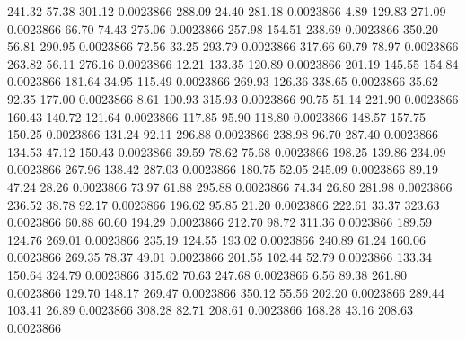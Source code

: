     241.32     57.38    301.12  0.0023866
    288.09     24.40    281.18  0.0023866
      4.89    129.83    271.09  0.0023866
     66.70     74.43    275.06  0.0023866
    257.98    154.51    238.69  0.0023866
    350.20     56.81    290.95  0.0023866
     72.56     33.25    293.79  0.0023866
    317.66     60.79     78.97  0.0023866
    263.82     56.11    276.16  0.0023866
     12.21    133.35    120.89  0.0023866
    201.19    145.55    154.84  0.0023866
    181.64     34.95    115.49  0.0023866
    269.93    126.36    338.65  0.0023866
     35.62     92.35    177.00  0.0023866
      8.61    100.93    315.93  0.0023866
     90.75     51.14    221.90  0.0023866
    160.43    140.72    121.64  0.0023866
    117.85     95.90    118.80  0.0023866
    148.57    157.75    150.25  0.0023866
    131.24     92.11    296.88  0.0023866
    238.98     96.70    287.40  0.0023866
    134.53     47.12    150.43  0.0023866
     39.59     78.62     75.68  0.0023866
    198.25    139.86    234.09  0.0023866
    267.96    138.42    287.03  0.0023866
    180.75     52.05    245.09  0.0023866
     89.19     47.24     28.26  0.0023866
     73.97     61.88    295.88  0.0023866
     74.34     26.80    281.98  0.0023866
    236.52     38.78     92.17  0.0023866
    196.62     95.85     21.20  0.0023866
    222.61     33.37    323.63  0.0023866
     60.88     60.60    194.29  0.0023866
    212.70     98.72    311.36  0.0023866
    189.59    124.76    269.01  0.0023866
    235.19    124.55    193.02  0.0023866
    240.89     61.24    160.06  0.0023866
    269.35     78.37     49.01  0.0023866
    201.55    102.44     52.79  0.0023866
    133.34    150.64    324.79  0.0023866
    315.62     70.63    247.68  0.0023866
      6.56     89.38    261.80  0.0023866
    129.70    148.17    269.47  0.0023866
    350.12     55.56    202.20  0.0023866
    289.44    103.41     26.89  0.0023866
    308.28     82.71    208.61  0.0023866
    168.28     43.16    208.63  0.0023866
